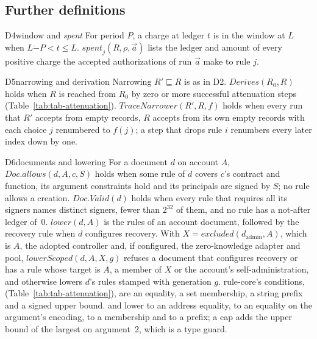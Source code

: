 
\subsection{Further definitions}

\begin{perchdefinition}{D4}{window and \textit{spent}}\label{def:d4}
For period $P$, a charge at ledger $t$ is in the window at $L$ when
$L \mathbin{\dot-} P < t \le L$. $\mathit{spent}_j(R, \rho, \vec a)$ lists the
ledger and amount of every positive charge the accepted authorizations of run
$\vec a$ make to rule $j$.
\end{perchdefinition}


\begin{perchdefinition}{D5}{narrowing and derivation}\label{def:d5}
Narrowing $R' \sqsubseteq R$ is as in D2. $\mathit{Derives}(R_0, R)$ holds when
$R$ is reached from $R_0$ by zero or more successful attenuation steps
(Table~\ref{tab:tab-attenuation}). $\mathit{TraceNarrower}(R', R, f)$ holds when
every run that $R'$ accepts from empty records, $R$ accepts from its own empty
records with each choice $j$ renumbered to $f(j)$; a step that drops rule $i$
renumbers every later index down by one.
\end{perchdefinition}

\begin{perchdefinition}{D6}{documents and lowering}\label{def:d6}
For a document $d$ on account $A$, $\mathit{Doc.allows}(d, A, c, S)$ holds when
some rule of $d$ covers $c$'s contract and function, its argument constraints
hold and its principals are signed by $S$; no rule allows a creation.
$\mathit{Doc.Valid}(d)$ holds when every rule that requires all its signers names
distinct signers, fewer than $2^{32}$ of them, and no rule has a not-after ledger
of~0. $\mathit{lower}(d, A)$ is the rules of an account document, followed by the
recovery rule when $d$ configures recovery. With
$X = \mathit{excluded}(d_{\mathrm{admin}}, A)$, which is $A$, the adopted
controller and, if configured, the zero-knowledge adapter and pool,
$\mathit{lowerScoped}(d, A, X, g)$ refuses a document that configures recovery
or has a rule whose target is $A$, a member of $X$ or the account's
self-administration, and otherwise lowers $d$'s rules stamped with generation
$g$. rule-core's conditions, 
(Table~\ref{tab:tab-attenuation}), are an equality, a set membership, a string
prefix and a signed upper bound.  and  lower to an
address equality,  to an equality on the argument's encoding,
 to a membership and  to a prefix; a cap adds
the upper bound of the largest  on argument~2, which is a type
guard.
\end{perchdefinition}

